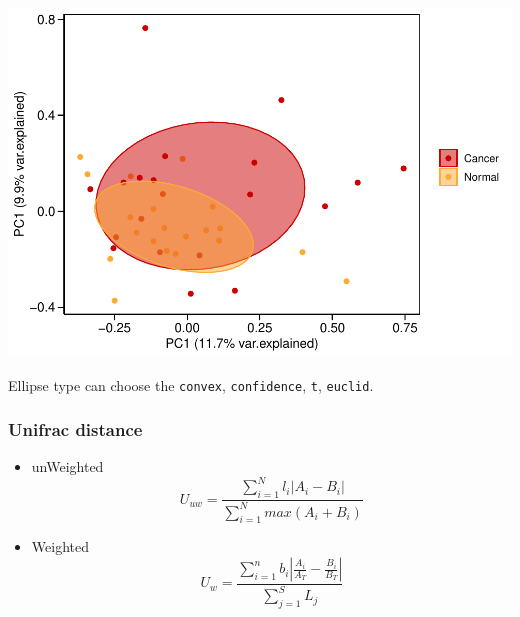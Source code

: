 \documentclass[
]{article}
\begin{document}
\includegraphics[width=0.7\linewidth,height=0.7\textheight]{workshop_files/figure-latex/unnamed-chunk-20-2}

Ellipse type can choose the \texttt{convex}, \texttt{confidence},
\texttt{t}, \texttt{euclid}.

\hypertarget{unifrac-distance}{%
\subsubsection{Unifrac distance}\label{unifrac-distance}}

\begin{itemize}
\item
  unWeighted
  \[ U_{uw} = \frac{\sum_{i=1}^N{l_i|A_{i} - B_{i}|}}{\sum_{i=1}^N{ max(A_{i} + B_{i})}} \]
\item
  Weighted
  \[ U_{w} = \frac{\sum_{i=1}^n{b_i| \frac{A_{i}}{A_T} - \frac{B_{i}}{B_T}|}}{\sum_{j=1}^S{L_j}} \]
\end{itemize}
\end{document}
